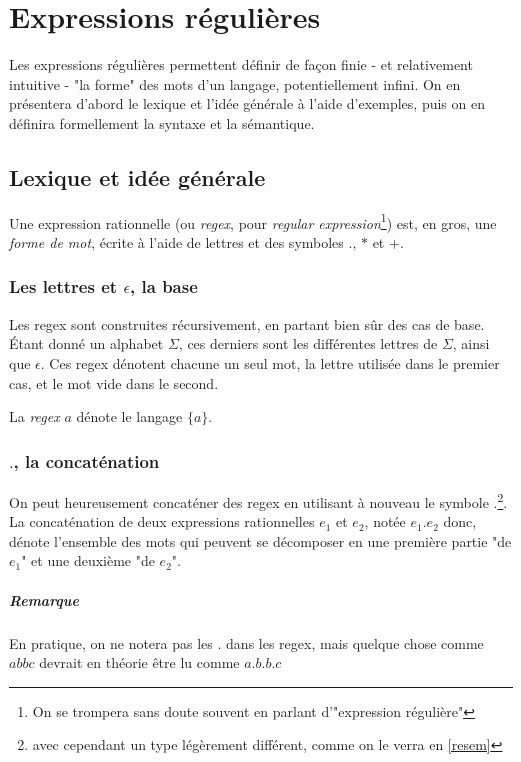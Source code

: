 \chapter{Expressions régulières}
\label{regex}
Les expressions régulières permettent définir de façon finie - et relativement intuitive - "la forme" des mots d'un langage, potentiellement infini. On en présentera d'abord le lexique et l'idée générale à l'aide d'exemples, puis on en définira formellement la syntaxe et la sémantique.

\section{Lexique et idée générale}

Une expression rationnelle (ou \textit{regex}, pour \textit{regular expression}\footnote{On se trompera sans doute souvent en parlant d'"expression régulière"}) est, en gros, une \textit{forme de mot}, écrite à l'aide de lettres et des symboles $.$, $*$ et $+$.

\subsection{Les lettres et $\epsilon$, la base}

Les regex sont construites récursivement, en partant bien sûr des cas de base. Étant donné un alphabet $\Sigma$, ces derniers sont les différentes lettres de $\Sigma$, ainsi que $\epsilon$. Ces regex dénotent chacune un seul mot, la lettre utilisée dans le premier cas, et le mot vide dans le second.


\begin{example}
La \textit{regex} $a$ dénote le langage $\{a\}$.
\end{example}


\subsection{$.$, la concaténation}

On peut heureusement concaténer des regex en utilisant à nouveau le symbole $.$\footnote{avec cependant un type légèrement différent, comme on le verra en \ref{resem}}. La concaténation de deux expressions rationnelles $e_1$ et $e_2$, notée $e_1.e_2$ donc, dénote l'ensemble des mots qui peuvent se décomposer en une première partie "de $e_1$" et une deuxième "de $e_2$".

\paragraph{Remarque} En pratique, on ne notera pas les $.$ dans les regex, mais quelque chose comme $abbc$ devrait en théorie être lu comme $a.b.b.c$


